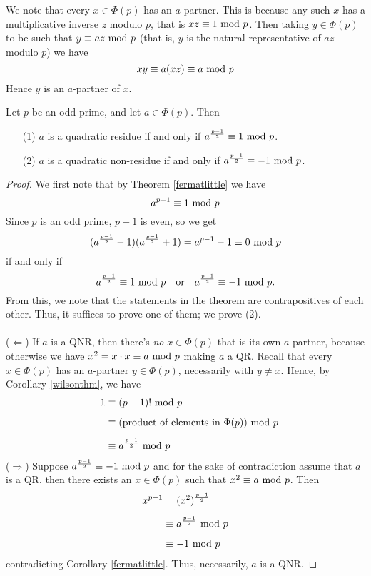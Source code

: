 \vspace*{0.5em}

\begin{remark}
We note that every $x \in \Phi(p)$ has an $a$-partner. This is because any such $x$ has a multiplicative inverse $z$ modulo $p$, that is $xz \equiv 1 \text{ mod }{p}$. Then taking $y \in \Phi(p)$ to be such that $y \equiv az \text{ mod }{p}$ (that is, $y$ is the natural representative of $az$ modulo $p$) we have 
\[xy \equiv a(xz) \equiv a \text{ mod }{p}\]
Hence $y$ is an $a$-partner of $x$.
\end{remark}

\vspace*{1.5em}

\begin{theorem}[Euler]\label{eulerqr}
Let $p$ be an odd prime, and let $a \in \Phi(p)$. Then
\begin{itemize}
\item[(1)] $a$ is a quadratic residue if and only if $a^{\frac{p-1}{2}} \equiv 1 \text{ mod }{p}$.
\item[(2)] $a$ is a quadratic non-residue if and only if $a^{\frac{p-1}{2}} \equiv -1 \text{ mod }{p}$.
\end{itemize}
\end{theorem}
\begin{proof}
We first note that by Theorem \ref{fermatlittle} we have
\[a^{p-1} \equiv 1\text{ mod }{p}\]
Since $p$ is an odd prime, $p-1$ is even, so we get
\[(a^{\frac{p-1}{2}}-1)(a^{\frac{p-1}{2}}+1) = a^{p-1} - 1 \equiv 0\text{ mod }{p}\]
if and only if
\[a^{\frac{p-1}{2}} \equiv 1 \text{ mod }{p}\quad \text{or}\quad a^{\frac{p-1}{2}} \equiv -1 \text{ mod }{p}.\] From this, we note that the statements in the theorem are contrapositives of each other. Thus, it suffices to prove one of them; we prove (2).\\
\\
($\Leftarrow$) If $a$ is a QNR, then there's \emph{no} $x \in \Phi(p)$ that is its own $a$-partner, because otherwise we have $x^2 = x\cdot x \equiv a \text{ mod }{p}$ making $a$ a QR. Recall that every $x \in \Phi(p)$ has an $a$-partner $y \in \Phi(p)$, necessarily with $y \neq x$. Hence, by Corollary \ref{wilsonthm}, we have
\begin{align*}
-1 &\equiv (p-1)!\text{ mod }{p}\\[0.5em]
&\equiv (\text{product of elements in $\Phi(p)$})\text{ mod }{p}\\[0.5em]
&\equiv a^{\frac{p-1}{2}}\text{ mod }{p}
\end{align*}
($\Rightarrow$) Suppose $a^{\frac{p-1}{2}} \equiv -1\text{ mod }{p}$ and for the sake of contradiction assume that $a$ is a QR, then there exists an $x \in \Phi(p)$ such that $x^2 \equiv a\text{ mod }{p}$. Then
\begin{align*}
x^{p-1} &= (x^2)^{\frac{p-1}{2}}\\[0.5em]
&\equiv a^{\frac{p-1}{2}} \text{ mod }{p}\\[0.5em]
&\equiv -1 \text{ mod }{p}
\end{align*}
contradicting Corollary \ref{fermatlittle}. Thus, necessarily, $a$ is a QNR.
\end{proof}

